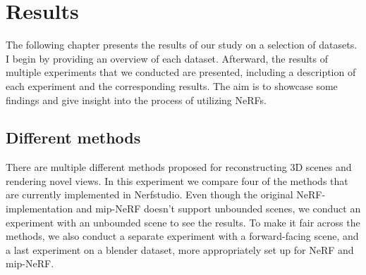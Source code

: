 \chapter{Results}

The following chapter presents the results of our study on a selection of datasets. I begin by providing an overview of each dataset. Afterward, the results of multiple experiments that we conducted are presented, including a description of each experiment and the corresponding results. The aim is to showcase some findings and give insight into the process of utilizing NeRFs.

\section{Different methods}
There are multiple different methods proposed for reconstructing 3D scenes and rendering novel views. In this experiment we compare four of the methods that are currently implemented in Nerfstudio. Even though the original NeRF-implementation and mip-NeRF doesn't support unbounded scenes, we conduct an experiment with an unbounded scene to see the results. To make it fair across the methods, we also conduct a separate experiment with a forward-facing scene, and a last experiment on a blender dataset, more appropriately set up for NeRF and mip-NeRF.

